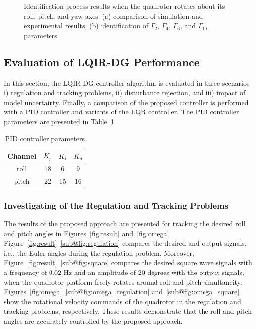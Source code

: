 \documentclass[3p]{elsarticle}
\begin{document}
\begin{figure}[H]
{    }
    \caption{Identification process results when the quadrotor rotates about its roll, pitch, and yaw axes: (a) comparison of simulation and experimental results. (b) identification of $\Gamma_2$, $\Gamma_4$, $\Gamma_6$, and
    $\Gamma_{10}$ parameters.}
    \label{fig:three_degree_identification}
\end{figure}
\subsection{Evaluation of LQIR-DG Performance}
\noindent In this section, the LQIR-DG controller algorithm is evaluated in three scenarios i) regulation and tracking problems, ii) disturbance rejection, and iii) impact of model uncertainty.
Finally, a comparison of the proposed controller is performed with a PID controller and variants of the LQR controller. 
The PID controller parameters are presented in Table~\ref{tab:PID_parameters}.
\begin{table}[H]
    \renewcommand{\arraystretch}{1.3}
    \caption{PID controller parameters}
    \vspace{-0.5cm}
    \begin{center}
        \begin{tabular}{cccc}
        \hline
        \textbf{Channel} & \textbf{$K_p$} & \textbf{$K_i$} & \textbf{$K_d$} \\
        \hline
        roll & 18 & 6 & 9 \\
        pitch & 22 & 15 & 16 \\
        \hline
        \end{tabular}
        \label{tab:PID_parameters}
    \end{center}
\end{table}
\subsubsection{Investigating of the Regulation and Tracking Problems}\label{sec:regulation}
\noindent The results of the proposed approach are presented for tracking the desired roll and pitch angles in Figures~\ref{fig:result} and~\ref{fig:omega}.
Figure~\ref{fig:result}~\ref{sub@fig:regulation} compares the desired and output signals, i.e., the Euler angles during the regulation problem. Moreover, Figure~\ref{fig:result}~\ref{sub@fig:square} compares the desired square wave signals with a frequency of 0.02 Hz and an amplitude of 20 degrees with the output signals, when the quadrotor platform freely rotates around roll and pitch simultaneity.
Figures~\ref{fig:omega}~\ref{sub@fig:omega_regulation} and~\ref{sub@fig:omega_square} show the rotational velocity commands of the quadrotor in the regulation and tracking problems, respectively. These results demonstrate that the roll and pitch angles are accurately controlled by the proposed approach.
\end{document}
